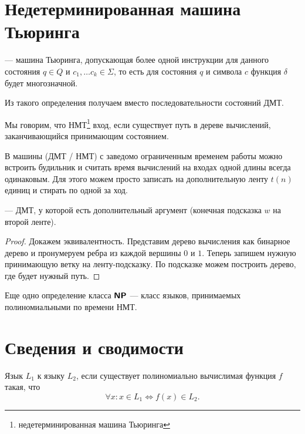 \section{Недетерминированная машина Тьюринга}
\begin{defn} 
	 --- машина Тьюринга, допускающая более одной инструкции для данного состояния $ q \in Q$ и $ c_1, \ldots c_k \in \Sigma $, то есть для состояния  $ q $ и символа $ c$ функция  $ \delta $ будет многозначной.
\end{defn}

Из такого определения получаем  вместо последовательности состояний ДМТ.

Мы говорим, что НМТ\footnote{недетерминированная машина Тьюринга}  вход, если существует путь в дереве вычислений, заканчивающийся принимающим состоянием.

\begin{st}
	В машины (ДМТ / НМТ) с заведомо ограниченным временем работы можно встроить \textsf{будильник} и считать время вычислений на входах одной длины всегда \textsf{одинаковым}.
	Для этого можем просто записать на дополнительную ленту $ t(n)$ единиц и стирать по одной за ход. 
\end{st}

\begin{defn}
	 --- ДМТ, у которой есть дополнительный аргумент (конечная подсказка $ w$ на второй ленте).
\end{defn}
\begin{proof}
	Докажем эквивалентность. Представим дерево вычисления как бинарное дерево и пронумеруем ребра из каждой вершины $ 0$ и $ 1$. Теперь запишем нужную принимающую ветку на ленту-подсказку.
	По подсказке можем построить дерево, где будет нужный путь.
\end{proof}
\begin{defn}\index{\NP}
    Еще одно определение класса $ \textmd{\textbf{\textsf{NP}}}$ --- класс языков, принимаемых полиномиальными по времени НМТ.
\end{defn}

\section{Сведения и сводимости}
\begin{defn}
	Язык $ L_1$   к языку $ L_2$, если существует полиномиально вычислимая функция $ f$ такая, что
	\[
		\forall x\colon x \in L_1 \Longleftrightarrow f(x) \in L_2
	.\] 
\end{defn}

